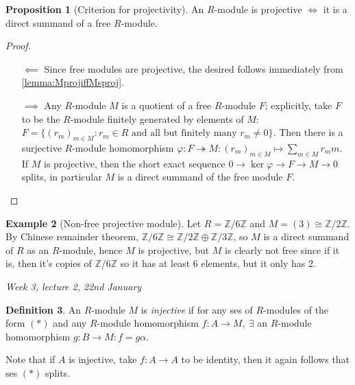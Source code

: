 \documentclass{article}
\newcommand{\Z}{\mathbb{Z}}
\theoremstyle{definition}
\newtheorem{defn}{Definition}[subsection]
\newtheorem{prop}[defn]{Proposition}
\newtheorem{example}[defn]{Example}
\begin{document}
\begin{prop}[Criterion for projectivity]
\label{prop:criterionproj}
An $R$-module is projective $\iff$ it is a direct summand of a free $R$-module.
\end{prop}
\begin{proof}
\begin{itemize}
\item[$\impliedby$] Since free modules are projective, the desired follows immediately from \ref{lemma:MprojiffMsproj}.
\item[$\implies$] Any $R$-module $M$ is a quotient of a free $R$-module $F$; explicitly, take $F$ to be the $R$-module finitely generated by elements of $M$: $F=\{(r_m)_{m\in M }:r_m\in R\text{ and all but finitely many }r_m\neq 0\}$. Then there is a surjective $R$-module homomorphism $\varphi:F\twoheadrightarrow M:(r_m)_{m\in M}\mapsto\sum_{m\in M}r_mm$. If $M$ is projective, then the short exact sequence $0\rightarrow\ker\varphi\rightarrow F\rightarrow M\rightarrow 0$ splits, in particular $M$ is a direct summand of the free module $F$.
\end{itemize}
\end{proof}

\begin{example}[Non-free projective module]
Let $R=\Z/6\Z$ and $M=(3)\cong\Z/2\Z$. By Chinese remainder theorem, $\Z/6\Z\cong\Z/2\Z\oplus\Z/3\Z$, so $M$ is a direct summand of $R$ as an $R$-module, hence $M$ is projective, but $M$ is clearly not free since if it is, then it's copies of $\Z/6\Z$ so it has at least 6 elements, but it only has 2.
\end{example}

\begin{flushright}
\textit{Week 3, lecture 2, 22nd January}
\end{flushright}

\begin{defn}
An $R$-module $M$ is \textit{injective} if for any ses of $R$-modules of the form $(\ast)$ and any $R$-module homomorphism $f:A\rightarrow M,\ \exists$ an $R$-module homomorphism $g:B\rightarrow M:f=g\alpha$.

Note that if $A$ is injective, take $f:A\rightarrow A$ to be identity, then it again follows that ses $(\ast)$ splits.
\end{defn}
\end{document}
